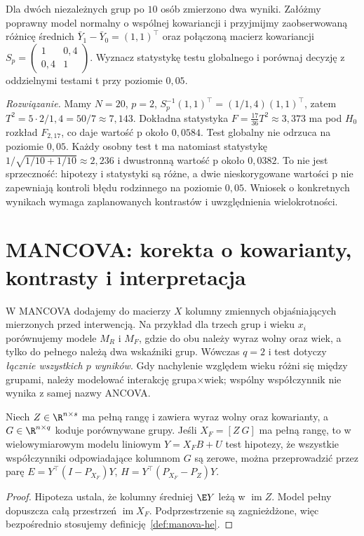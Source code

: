 \begin{zadanie}
Dla dwóch niezależnych grup po $10$ osób zmierzono dwa wyniki. Załóżmy poprawny model normalny o wspólnej kowariancji i przyjmijmy zaobserwowaną różnicę średnich $\bar Y_1-\bar Y_0=(1,1)^\top$ oraz połączoną macierz kowariancji
$S_p=\begin{pmatrix}1&0{,}4\\0{,}4&1\end{pmatrix}$.
Wyznacz statystykę testu globalnego i porównaj decyzję z oddzielnymi testami t przy poziomie $0{,}05$.\par
\emph{Rozwiązanie.} Mamy $N=20$, $p=2$, $S_p^{-1}(1,1)^\top=(1/1{,}4)(1,1)^\top$, zatem $T^2=5\cdot 2/1{,}4=50/7\approx7{,}143$. Dokładna statystyka $F=\frac{17}{36}T^2\approx3{,}373$ ma pod $H_0$ rozkład $F_{2,17}$, co daje wartość p około $0{,}0584$. Test globalny nie odrzuca na poziomie $0{,}05$. Każdy osobny test t ma natomiast statystykę $1/\sqrt{1/10+1/10}\approx2{,}236$ i dwustronną wartość p około $0{,}0382$. To nie jest sprzeczność: hipotezy i statystyki są różne, a dwie nieskorygowane wartości p nie zapewniają kontroli błędu rodzinnego na poziomie $0{,}05$. Wniosek o konkretnych wynikach wymaga zaplanowanych kontrastów i uwzględnienia wielokrotności.
\end{zadanie}

\section{MANCOVA: korekta o kowarianty, kontrasty i interpretacja}
W MANCOVA dodajemy do macierzy $X$ kolumny zmiennych objaśniających mierzonych przed interwencją. Na przykład dla trzech grup i wieku $x_i$ porównujemy modele $M_R$ i $M_F$, gdzie do obu należy wyraz wolny oraz wiek, a tylko do pełnego należą dwa wskaźniki grup. Wówczas $q=2$ i test dotyczy \emph{łącznie wszystkich $p$ wyników}. Gdy nachylenie względem wieku różni się między grupami, należy modelować interakcję grupa$\times$wiek; wspólny współczynnik nie wynika z samej nazwy ANCOVA.

\begin{stwierdzenie}\label{prop:mancova-adjusted}
Niech $Z\in\R^{n\times s}$ ma pełną rangę i zawiera wyraz wolny oraz kowarianty, a $G\in\R^{n\times q}$ koduje porównywane grupy. Jeśli $X_F=[Z\ G]$ ma pełną rangę, to w wielowymiarowym modelu liniowym $Y=X_FB+U$ test hipotezy, że wszystkie współczynniki odpowiadające kolumnom $G$ są zerowe, można przeprowadzić przez parę
$E=Y^\top(I-P_{X_F})Y$, $H=Y^\top(P_{X_F}-P_Z)Y$.
\end{stwierdzenie}
\begin{proof}
Hipoteza ustala, że kolumny średniej $\E Y$ leżą w $\operatorname{im}Z$. Model pełny dopuszcza całą przestrzeń $\operatorname{im}X_F$. Podprzestrzenie są zagnieżdżone, więc bezpośrednio stosujemy definicję~\ref{def:manova-he}.
\end{proof}

